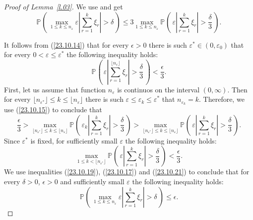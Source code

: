 \documentclass{article}
\theoremstyle{plain}
\theoremstyle{definition}
\theoremstyle{remark}
\newcommand{\p}[2][]{{\mathbb{P}}_{#1} \left( \, #2 \, \right) } %
\newcommand{\beq}{\begin{equation}}
\newcommand{\eeq}{\end{equation}}
\begin{document}
\begin{proof}[Proof of Lemma~\ref{l.03}]
We use \citet[theorem 22.5]{billingsley2017probability} and get
\beq\label{23.10.19}
\p{\max\limits_{1\leqslant k \leqslant n_\varepsilon}\varepsilon\left|\sum\limits_{r=1}^{k}\xi_r\right|>\delta}
\leqslant 3\max\limits_{1\leqslant k \leqslant n_\varepsilon}\p{\varepsilon\left|\sum\limits_{r=1}^{k}\xi_r\right|>\frac{\delta}{3}}.
\eeq

It follows from (\ref{23.10.14}) that for every $\epsilon>0$  there is such $\varepsilon^*\in(0,\varepsilon_0)$ that for every
$0<\varepsilon\leq\varepsilon^*$ the following inequality holds:
\beq\label{23.10.15}
\p{\varepsilon\left|\sum\limits_{r=1}^{\lfloor n_{\varepsilon} \rfloor}\xi_r\right|>\frac{\delta}{3}}<\frac{\epsilon}{3}.
\eeq
First, let us assume that function $n_\varepsilon$ is continuos on the interval $(0,\infty)$. Then for every $\lfloor n_{\varepsilon^*} \rfloor \leqslant k \leqslant \lfloor n_{\varepsilon} \rfloor$
there is such $\varepsilon\leq\varepsilon_k\leq\varepsilon^*$ that $n_{\varepsilon_k}=k$.
Therefore, we use (\ref{23.10.15}) to conclude that
\beq\label{23.10.17}
\frac{\epsilon}{3}>\max\limits_{\lfloor n_{\varepsilon^*} \rfloor \leqslant k\leqslant \lfloor n_{\varepsilon}\rfloor}
\p{\varepsilon_k\left|\sum\limits_{r=1}^{k}\xi_r\right|>\frac{\delta}{3}}>
\max\limits_{\lfloor n_{\varepsilon^*}\rfloor\leqslant k\leqslant \lfloor n_{\varepsilon}\rfloor}
\p{\varepsilon\left|\sum\limits_{r=1}^{k}\xi_r\right|>\frac{\delta}{3}}.
\eeq
Since $\varepsilon^*$ is fixed, for sufficiently small $\varepsilon$ 
the following inequality holds:
\beq\label{23.10.21}
\max\limits_{1\leqslant k< \lfloor n_{\varepsilon^*} \rfloor}\p{\varepsilon\left|\sum\limits_{r=1}^{k}\xi_r\right|>\frac{\delta}{3}}
<\frac{\epsilon}{3}.
\eeq
We use inequalities (\ref{23.10.19}), (\ref{23.10.17}) and (\ref{23.10.21}) to conclude that
for every $\delta>0$, $\epsilon>0$ and sufficiently small $\varepsilon$ the following inequality holds:
$$
\p{\max\limits_{1\leqslant k \leqslant n_\varepsilon}\varepsilon\left|\sum\limits_{r=1}^{k}\xi_r\right|>\delta}
\leqslant \epsilon.
$$


\end{proof}
\end{document}
